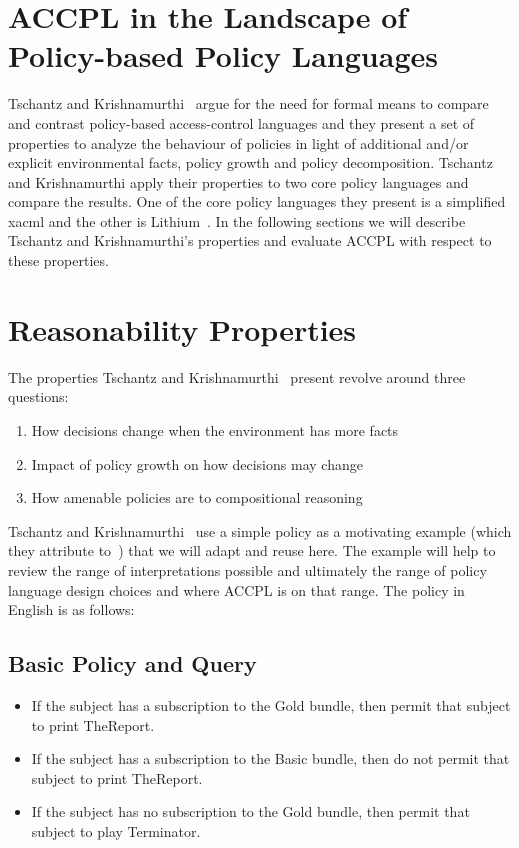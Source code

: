  
\section{ACCPL in the Landscape of Policy-based Policy Languages}

Tschantz and Krishnamurthi~\cite{Tschantz} argue for the need for formal means to compare and contrast policy-based access-control languages and they present a set of properties to analyze the behaviour of policies in light of additional and/or explicit environmental facts, policy growth and policy decomposition. Tschantz and Krishnamurthi apply their properties to two core policy languages and compare the results. One of the core policy languages they present is a simplified \ac{xacml} and the other is Lithium~\cite{Halpern2008}. In the following sections we will describe Tschantz and Krishnamurthi's properties and evaluate \ac{ACCPL} with respect to these properties.

\section{Reasonability Properties}

The properties Tschantz and Krishnamurthi~\cite{Tschantz} present revolve around three questions:

\begin{enumerate}
\item How decisions change when the environment has more facts
\item Impact of policy growth on how decisions may change
\item How amenable policies are to compositional reasoning
\end{enumerate}

Tschantz and Krishnamurthi~\cite{Tschantz} use a simple policy as a motivating example (which they attribute to~\cite{Halpern2008}) that we will adapt and reuse here. The example will help to review the range of interpretations possible and ultimately the range of policy language design choices and where \ac{ACCPL} is on that range.
The policy in English is as follows:
\subsection{Basic Policy and Query}\label{sec:basicpolicyenglish}
\begin{itemize}
\item If the subject has a subscription to the Gold bundle, then permit that subject to print TheReport.

\item If the subject has a subscription to the Basic bundle, then do not permit that subject to print TheReport.

\item If the subject has no subscription to the Gold bundle, then permit that subject to play Terminator.
\end{itemize}

